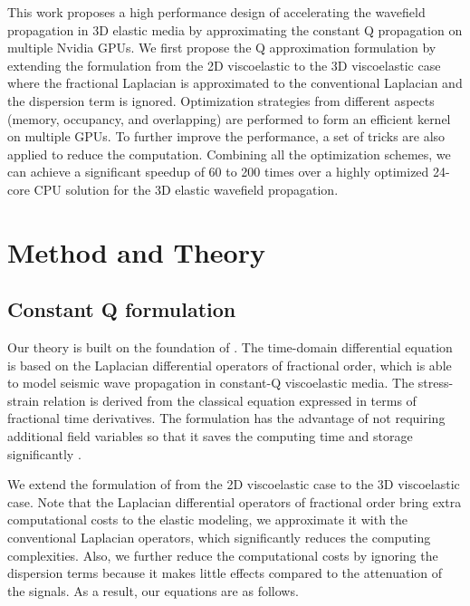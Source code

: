 \documentclass{paris17}
\begin{document}
This work proposes a high performance design of accelerating the wavefield propagation in 3D elastic media by approximating the constant Q propagation on multiple Nvidia GPUs. We first propose the Q approximation formulation by extending the formulation from the 2D viscoelastic to the 3D viscoelastic case where the fractional Laplacian is approximated to the conventional Laplacian and the dispersion term is ignored.  Optimization strategies from different aspects (memory, occupancy, and overlapping) are performed to form an efficient kernel on multiple GPUs. To further improve the performance, a set of tricks are also applied to reduce the computation. Combining all the optimization schemes, we can achieve a significant speedup of 60 to 200 times over a highly optimized 24-core CPU solution for the 3D elastic wavefield propagation.

\section{Method and Theory}

\subsection{Constant Q formulation}

Our theory is built on the foundation of \cite{zhu2014theory}. The time-domain differential equation is based on the Laplacian differential operators of fractional order, which is able to model seismic wave propagation in constant-Q viscoelastic media. The stress-strain relation is derived from the classical equation expressed in terms of fractional time derivatives. The formulation has the advantage of not requiring additional field variables so that it saves the computing time and storage significantly \cite[]{zhu2014theory}.

We extend the formulation of \cite{zhu2014theory} from the 2D viscoelastic case to the 3D viscoelastic case. Note that the Laplacian differential operators of fractional order bring extra computational costs to the elastic modeling, we approximate it with the conventional Laplacian operators, which significantly reduces the computing complexities. Also, we further reduce the computational costs by ignoring the dispersion terms because it makes little effects compared to the attenuation of the signals. As a result, our equations are as follows.
\end{document}

